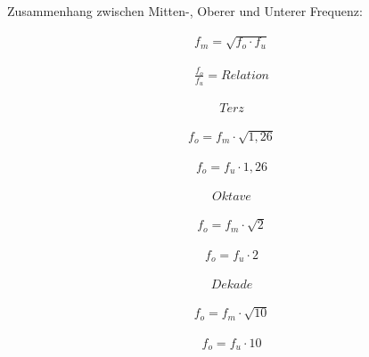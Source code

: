 \documentclass[a4paper, 12pt]{report}
\begin{document}
	
	\vspace*{1cm}
	
	Zusammenhang zwischen Mitten-, Oberer und Unterer Frequenz:

	{\large
		\begin{minipage}[t]{0.5\textwidth} 
			\begin{align*} 
					f_m = \sqrt{f_o  \cdot  f_u}
			\end{align*} 
		\end{minipage}
		\begin{minipage}[t]{0.5\textwidth} 
			\begin{align*} 
				\frac{f_o}{f_u} = Relation
			\end{align*} 
		\end{minipage}
	}

	\begin{minipage}[t]{0.2\textwidth} 
		\begin{align*} 
			Terz
		\end{align*} 
	\end{minipage} 
	\begin{minipage}[t]{0.4\textwidth} 
		\begin{align*} 
			f_o = f_m  \cdot  \sqrt{1,26}
		\end{align*} 
	\end{minipage}
	\begin{minipage}[t]{0.4\textwidth} 
		\begin{align*} 
			f_o = f_u \cdot 1,26
		\end{align*} 
	\end{minipage}

	\begin{minipage}[t]{0.2\textwidth} 
		\begin{align*} 
			Oktave
		\end{align*} 
	\end{minipage} 
	\begin{minipage}[t]{0.4\textwidth} 
		\begin{align*} 
			f_o = f_m  \cdot  \sqrt{2}
		\end{align*} 
	\end{minipage}
	\begin{minipage}[t]{0.4\textwidth} 
		\begin{align*} 
			f_o = f_u \cdot  2
		\end{align*} 
	\end{minipage}

	\begin{minipage}[t]{0.2\textwidth} 
		\begin{align*} 
			Dekade
		\end{align*} 
	\end{minipage} 
	\begin{minipage}[t]{0.4\textwidth} 
		\begin{align*} 
			f_o = f_m  \cdot  \sqrt{10}
		\end{align*} 
	\end{minipage}
	\begin{minipage}[t]{0.4\textwidth} 
		\begin{align*} 
			f_o = f_u \cdot 10
		\end{align*} 
	\end{minipage}
	
\end{document}
